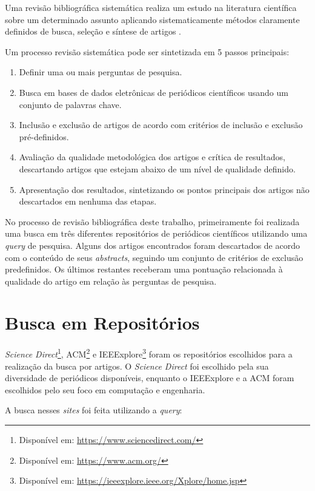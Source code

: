 \documentclass[12pt]{report}
\begin{document}
Uma revisão bibliográfica sistemática realiza um estudo na literatura científica sobre um determinado assunto aplicando sistematicamente métodos claramente definidos de busca, seleção e síntese de artigos \cite{sampaio2007}.

Um processo revisão sistemática pode ser sintetizada em 5 passos principais:

\begin{enumerate}
    \item Definir uma ou mais perguntas de pesquisa.
    \item Busca em bases de dados eletrônicas de periódicos científicos usando um conjunto de palavras chave.
    \item Inclusão e exclusão de artigos de acordo com critérios de inclusão e exclusão pré-definidos.
    \item Avaliação da qualidade metodológica dos artigos e crítica de resultados, descartando artigos que estejam abaixo de um nível de qualidade definido.
    \item Apresentação dos resultados, sintetizando os pontos principais dos artigos não descartados em nenhuma das etapas.
\end{enumerate}

No processo de revisão bibliográfica deste trabalho, primeiramente foi realizada uma busca em três diferentes repositórios de periódicos científicos utilizando uma \textit{query} de pesquisa. Alguns dos artigos encontrados foram descartados de acordo com o conteúdo de seus \textit{abstracts}, seguindo um conjunto de critérios de exclusão predefinidos. Os últimos restantes receberam uma pontuação relacionada à qualidade do artigo em relação às perguntas de pesquisa.

\section{Busca em Repositórios} \label{sec:busca_em_repositorios}

\textit{Science Direct}\footnote{Disponível em: \url{https://www.sciencedirect.com/}}, ACM\footnote{Disponível em: \url{https://www.acm.org/}} e IEEExplore\footnote{Disponível em: \url{https://ieeexplore.ieee.org/Xplore/home.jsp}} foram os repositórios escolhidos para a realização da busca por artigos. O \textit{Science Direct} foi escolhido pela sua diversidade de periódicos disponíveis, enquanto o IEEExplore e a ACM foram escolhidos pelo seu foco em computação e engenharia.

A busca nesses \textit{sites} foi feita utilizando a \textit{query}:
\end{document}
